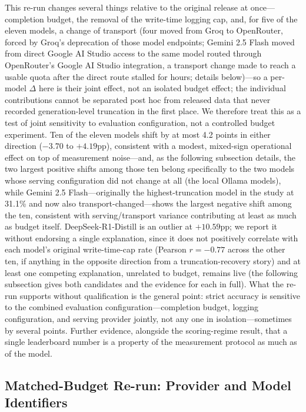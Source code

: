 This re-run changes several things relative to the original release at once---completion budget, the
removal of the write-time logging cap, and, for five of the eleven models, a change of transport
(four moved from Groq to OpenRouter, forced by Groq's deprecation of those model endpoints; Gemini
2.5 Flash moved from direct Google AI Studio access to the same model routed through OpenRouter's
Google AI Studio integration, a transport change made to reach a usable quota after the direct
route stalled for hours; details below)---so a per-model $\Delta$ here is their joint effect, not an
isolated budget effect; the individual contributions cannot be separated post hoc from released data
that never recorded generation-level truncation in the first place. We therefore treat this as a
test of joint sensitivity to evaluation configuration, not a controlled budget experiment. Ten of the
eleven models shift by at most 4.2 points in either direction ($-3.70$ to $+4.19$pp), consistent with
a modest, mixed-sign operational effect on top of measurement noise---and, as the following
subsection details, the two largest positive shifts among those ten belong specifically to the two
models whose serving configuration did not change at all (the local Ollama models), while Gemini 2.5
Flash---originally the highest-truncation model in the study at 31.1\% and now also
transport-changed---shows the largest negative shift among the ten, consistent with serving/transport
variance contributing at least as much as budget itself. DeepSeek-R1-Distill is an outlier at
$+10.59$pp; we report it without endorsing a single explanation, since it does not positively
correlate with each model's original write-time-cap rate (Pearson $r = -0.77$ across the other ten,
if anything in the opposite direction from a truncation-recovery story) and at least one competing
explanation, unrelated to budget, remains live (the following subsection gives both candidates and
the evidence for each in full). What the re-run supports without qualification is the general point:
strict accuracy is sensitive to the combined evaluation configuration---completion budget, logging
configuration, and serving provider jointly, not any one in isolation---sometimes by several points.
Further evidence, alongside the scoring-regime result, that a single leaderboard number is a property
of the measurement protocol as much as of the model.

\subsection{Matched-Budget Re-run: Provider and Model Identifiers}
\label{app:matched-budget-ids}

